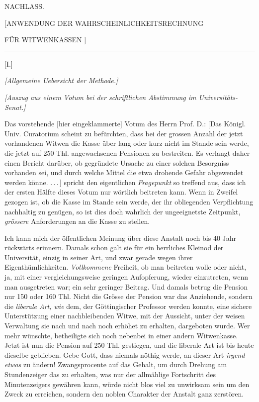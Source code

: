 \clearpage
{}
\begin{center}
{\Large NACHLASS.\par}\bigskip
{\large [ANWENDUNG DER WAHRSCHEINLICHKEITSRECHNUNG\par}
\medskip
{\large FÜR WITWENKASSEN ]\par}
\medskip\rule{.15\linewidth}{.3pt}\par\bigskip
{\large [I.]\par}
\textit{[Allgemeine Uebersicht der Methode.]}\par
\textit{[Auszug aus einem Votum bei der schriftlichen Abstimmung im Universitäts-Senat.]}\par
\end{center}
Das vorstehende [hier eingeklammerte] Votum des Herrn Prof. D.: [Das Königl. Univ. Curatorium scheint zu befürchten, dass bei der grossen Anzahl der jetzt vorhandenen Witwen die Kasse über lang oder kurz nicht im Stande sein werde, die jetzt auf 250 Thl. angewachsenen Pensionen zu bestreiten. Es verlangt daher einen Bericht darüber, ob gegründete Ursache zu einer solchen Besorgniss vorhanden sei, und durch welche Mittel die etwa drohende Gefahr abgewendet werden könne. .\,.\,.\,] spricht den eigentlichen \textit{Fragepunkt} so treffend aus, dass ich der ersten Hälfte dieses Votum nur wörtlich beitreten kann. Wenn in Zweifel gezogen ist, ob die Kasse im Stande sein werde, der ihr obliegenden Verpflichtung nachhaltig zu genügen, so ist dies doch wahrlich der ungeeignetste Zeitpunkt, \textit{grössere} Anforderungen an die Kasse zu stellen.

\indent Ich kann mich der öffentlichen Meinung über diese Anstalt noch bis 40 Jahr rückwärts erinnern. Damals schon galt sie für ein herrliches Kleinod der Universität, einzig in seiner Art, und zwar gerade wegen ihrer Eigenthümlichkeiten. \textit{Vollkommene} Freiheit, ob man beitreten wolle oder nicht, ja, mit einer vergleichungsweise geringen Aufopferung, wieder einzutreten, wenn man ausgetreten war; ein sehr geringer Beitrag. Und damals betrug die Pension nur 150 oder 160 Thl. Nicht die Grösse der Pension war das Anziehende, sondern die \textit{liberale Art, wie} dem, der Göttingischer Professor werden konnte, eine sichere Unterstützung einer nachbleibenden Witwe, mit der Aussicht, unter der weisen Verwaltung sie nach und nach noch erhöhet zu erhalten, dargeboten wurde. Wer mehr wünschte, betheiligte sich noch nebenbei in einer andern Witwenkasse. Jetzt ist nun die Pension auf 250 Thl. gestiegen, und die liberale Art ist bis heute dieselbe geblieben. Gebe Gott, dass niemals nöthig werde, an dieser Art \textit{irgend etwas} zu ändern! Zwangsprocente auf das Gehalt, um durch Drehung am Stundenzeiger das zu erhalten, was nur der allmählige Fortschritt des Minutenzeigers gewähren kann, würde nicht blos viel zu unwirksam sein um den Zweck zu erreichen, sondern den noblen Charakter der Anstalt ganz zerstören.
